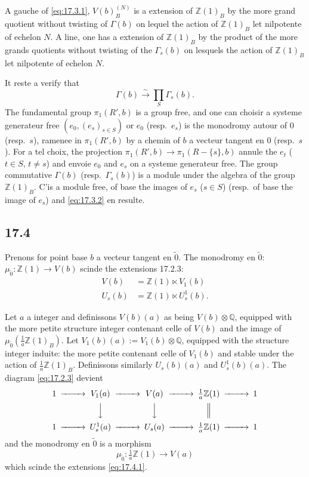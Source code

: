 \documentclass[12pt,a4paper]{article}
\theoremstyle{plain}
\theoremstyle{definition}
\theoremstyle{remark}
\newcommand{\Betti}{B}
\newcommand{\ZZ}{\mathbb{Z}}
\newcommand{\QQ}{\mathbb{Q}}
\begin{document}
A gauche of \eqref{eq:17.3.1}, $V(b)_\Betti^{(N)}$ is a extension
of $\ZZ(1)_\Betti$ by the more grand quotient without twisting of
$\Gamma(b)$ on lequel the action of $\ZZ(1)_\Betti$ let nilpotente
of echelon $N$. A line, one has a extension of $\ZZ(1)_\Betti$ by the
product of the more grands quotients without twisting of the $\Gamma_s(b)$ on
lesquels the action of $\ZZ(1)_\Betti$ let nilpotente of echelon $N$.

It reste a verify that
\begin{equation}\label{eq:17.3.2}
\Gamma(b) \xrightarrow{\sim} \prod_S \Gamma_s(b).
\end{equation}
The fundamental group $\pi_1(R',b)$ is a group free, and one can
choisir a systeme generateur free $(e_0, (e_s)_{s \in S})$ or $e_0$
(resp.\ $e_s$) is the monodromy autour of $0$ (resp.\ $s$), ramenee
in $\pi_1(R',b)$ by a chemin of $b$ a vecteur tangent en $0$
(resp.\ $s$). For a tel choix, the projection
$\pi_1(R',b) \to \pi_1(R-\{s\},b)$ annule the $e_t$ ($t \in S$,
$t \neq s$) and envoie $e_0$ and $e_s$ on a systeme generateur free.
The group commutative $\Gamma(b)$ (resp.\ $\Gamma_s(b)$) is a module
under the algebra of the group $\ZZ(1)_\Betti$. C'is a module free, of
base the images of $e_s$ ($s \in S$) (resp.\ of base the image of $e_s$)
and \eqref{eq:17.3.2} en resulte.

\subsection{17.4}

Prenons for point base $b$ a vecteur tangent en $\tilde{0}$. The
monodromy en $\tilde{0}$: $\mu_{\tilde{0}} : \ZZ(1) \to V(b)$ scinde
the extensions 17.2.3:
\begin{align*}
V(b) &= \ZZ(1) \ltimes V_1(b) \\
U_s(b) &= \ZZ(1) \ltimes U_s^1(b).
\end{align*}

Let $a$ a integer and definissons $V(b)(a)$ as being
$V(b) \otimes \QQ$, equipped with the more petite structure integer contenant
celle of $V(b)$ and the image of
$\mu_{\tilde{0}}(\frac{1}{a}\ZZ(1)_\Betti)$. Let
$V_1(b)(a) := V_1(b) \otimes \QQ$, equipped with the structure integer
induite: the more petite contenant celle of $V_1(b)$ and stable under
the action of $\frac{1}{a}\ZZ(1)_\Betti$. Definissons similarly $U_s(b)(a)$
and $U_s^1(b)(a)$. The diagram \eqref{eq:17.2.3} devient
\begin{equation}\label{eq:17.4.1}
\begin{CD}
1 @>>> V_1(a) @>>> V(a) @>>> \frac{1}{a}\ZZ(1) @>>> 1 \\
@. @VVV @VVV @| \\
1 @>>> U_s^1(a) @>>> U_s(a) @>>> \frac{1}{a}\ZZ(1) @>>> 1
\end{CD}
\end{equation}
and the monodromy en $\tilde{0}$ is a morphism
\begin{equation}\label{eq:17.4.2}
\mu_{\tilde{0}} : \tfrac{1}{a}\ZZ(1) \to V(a)
\end{equation}
which scinde the extensions \eqref{eq:17.4.1}.
\end{document}
